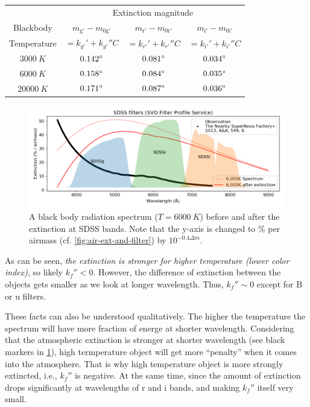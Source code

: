\begin{table}[ht!]
\centering
  \begin{tabular}{c||ccc}
   & \multicolumn{3}{c}{Extinction magnitude} \\
   Blackbody & $ m_\mathrm{g'} - m_\mathrm{0 g'} $ & $ m_\mathrm{r'} - m_\mathrm{0 r'} $ & $ m_\mathrm{i'} - m_\mathrm{0 i'} $ \\
  Temperature & $ = k_{g'}' + k_{g'}'' C $ & $ = k_{r'}' + k_{r'}'' C $ & $ = k_{i'}' + k_{i'}'' C $ \\
  \hline
  $ \SI{3000}{K} $  & $ \m{0.142} $ & $ \m{0.081} $ & $ \m{0.034} $ \\
  $ \SI{6000}{K} $  & $ \m{0.158} $ & $ \m{0.084} $ & $ \m{0.035} $ \\
  $ \SI{20000}{K} $ & $ \m{0.171} $ & $ \m{0.087} $ & $ \m{0.036} $ \\
  \end{tabular}
\end{table}

\begin{figure}[ht!]
\centering
\includegraphics[width=0.9\linewidth]{figs/air-ext-bbrad}
\caption{A black body radiation spectrum ($ T = \SI{6000}{K} $) before and after the extinction at SDSS bands. Note that the y-axis is changed to \% per airmass (cf. \cref{fig:air-ext-and-filter}) by $ 10^{-0.4 \Delta m} $.}
\label{fig:air-ext-bbrad}
\end{figure}

As can be seen, \emph{the extinction is stronger for higher temperature (lower color index)}, so likely $ k_f'' < 0 $. However, the difference of extinction between the objects gets smaller as we look at longer wavelength. Thus, $ k_f'' \sim 0 $ except for B or u filters.

These facts can also be understood qualitatively. The higher the temperature the spectrum will have more fraction of energe at shorter wavelength. Considering that the atmospheric extinction is stronger at shorter wavelength (see black markers in \cref{fig:air-ext-bbrad}), high termperature object will get more ``penalty'' when it comes into the atmosphere. That is why high temperature object is more strongly extincted, i.e., $ k_f'' $ is negative. At the same time, since the amount of extinction drops significantly at wavelengths of r and i bands, and making $ k_f'' $ itself very small. 


